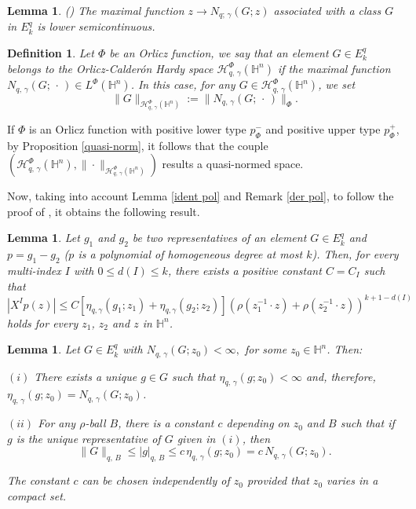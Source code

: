 \documentclass[oneside,10pt]{article}
\newtheorem{definition}[theorem]{Definition}
\newtheorem{lemma}[theorem]{Lemma}
\begin{document}
\begin{lemma} (\cite[Lemma 4.1]{rocha3}) \label{semicont} The maximal function $z \to N_{q; \, \gamma}(G; z)$ associated with a class $G$ in 
$E_{k}^{q}$ is lower semicontinuous.
\end{lemma}


\begin{definition}
Let $\Phi$ be an Orlicz function, we say that an element $G \in E^{q}_{k}$ belongs to the Orlicz-Calder\'on Hardy space
$\mathcal{H}^{\Phi}_{q, \, \gamma}(\mathbb{H}^{n})$ if the maximal function $N_{q, \, \gamma}(G; \, \cdot \,) \in L^{\Phi}(\mathbb{H}^{n})$. 
In this case, for any $G \in \mathcal{H}^{\Phi}_{q, \, \gamma}(\mathbb{H}^{n})$, we set
\[
\| G \|_{\mathcal{H}^{\Phi}_{q, \, \gamma}(\mathbb{H}^{n})} := \| N_{q, \, \gamma}(G; \, \cdot \,) \|_{\Phi}.
\]
\end{definition}

If $\Phi$ is an Orlicz function with positive lower type $p_{\Phi}^{-}$ and positive upper type $p_{\Phi}^{+}$, by 
Proposition \ref{quasi-norm}, it follows that the couple
$\left( \mathcal{H}^{\Phi}_{q, \, \gamma}(\mathbb{H}^{n}),  \| \cdot \|_{\mathcal{H}^{\Phi}_{q, \, \gamma}(\mathbb{H}^{n})} \right)$ results 
a quasi-normed space.

Now, taking into account Lemma \ref{ident pol} and Remark \ref{der pol}, to follow the proof of \cite[Lemma 3]{calderon}, it obtains the following result.

\begin{lemma} \label{estim pol}
Let $g_1$ and $g_2$ be two representatives of an element $G \in E^q_k$ and $p = g_1 - g_2$ ($p$ is a polynomial of homogeneous degree at 
most $k$). Then, for every multi-index $I$ with $0 \leq d(I) \leq k$, there exists a positive constant $C = C_{I}$ such that
\[
|X^{I}p(z)| \leq C \left[ \eta_{q, \gamma}(g_1; z_1) + \eta_{q, \gamma}(g_2; z_2) \right] 
\left( \rho(z_1^{-1} \cdot z) + \rho(z_2^{-1} \cdot z) \right)^{k+1 - d(I)}
\]
holds for every $z_1$, $z_2$ and $z$ in $\mathbb{H}^n$.
\end{lemma}


\begin{lemma} \label{puntual 1} Let $G \in E^{q}_{k}$ with $N_{q, \, \gamma}(G; z_0) < \infty,$ for some $z_0 \in \mathbb{H}^{n}$. Then:

\qquad

$(i)$ There exists a unique $g \in G$ such that $\eta_{q, \, \gamma} (g; z_0) < \infty$ and, therefore, 
$\eta_{q, \, \gamma} (g; z_0) = N_{q, \, \gamma}(G; z_0)$.

$(ii)$ For any $\rho$-ball $B$, there is a constant $c$ depending on $z_0$ and $B$ such that if $g$ is the unique representative of $G$ given in $(i)$, then
$$\|G\|_{q, \, B} \leq |g|_{q, \, B} \leq c \, \eta_{q, \, \gamma} (g; z_0) = c \, N_{q, \, \gamma}(G; z_0).$$

The constant $c$ can be chosen independently of $z_0$ provided that $z_0$ varies in a compact set.
\end{lemma}
\end{document}
